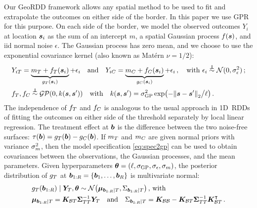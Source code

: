 \documentclass{article}
\begin{document}
\label{sec:gpmodel}
Our GeoRDD framework allows any spatial method to be used to fit and extrapolate the outcomes on either side of the border.
In this paper we use GPR \citep{banerjee2014hierarchical,rasmussen2006gaussian} for this purpose.
On each side of the border, we model the observed outcomes \(Y_i\) at location \(\bm{s}_i\) as the sum of an intercept \(m\), a spatial Gaussian process \(f(\bm{s})\), and iid normal noise \(\epsilon\).
The Gaussian process has zero mean, and we choose to use the exponential covariance kernel (also known as Mat\'ern \(\nu=1/2\)):
\begin{equation}
    \begin{split}
        & Y_{i\treat} = \underbrace{m_\treat{} + f_\treat{}(\svec_i)}_{g_\treat{}(\svec_i)} + \epsilon_i \quad\text{and}\quad
          Y_{i\ctrol} = \underbrace{m_\ctrol{} + f_\ctrol{}(\svec_i)}_{g_\ctrol{}(\svec_i)} + \epsilon_i 
          \,,\quad\text{with } \epsilon_i \overset{\indep}{\sim} \normal(0, \sigman^2) \,; \\
        & f_\treat{}, f_\ctrol{} \overset{\indep}{\sim} \GP\del{0, k(\svec, \svec')} \quad\text{with}\quad
        k(\svec,\svec') = \sigmaf^2 \exp\del{-\norm{\svec-\svec'}_2 \big/ \ell} \,.
    \end{split}
    \label{eq:spec2gp}
\end{equation}
The independence of \(f_T{}\) and \(f_C{}\) is analogous to the usual approach in 1D~RDDs of fitting the outcomes on either side of the threshold separately by local linear regression.
The treatment effect at \(\bm{b}\) is the difference between the two noise-free surfaces:
    \(\tau(\bm{b}) = g_T{}(\bm{b}) - g_C{}(\bm{b})\).
\label{sec:inference}
If \(m_T\) and \(m_C\) are given normal priors with variance \(\sigma_{m}^2\), then the model specification \autoref{eq:spec2gp} can be used to obtain covariances between the observations, the Gaussian processes, and the mean parameters.
Given hyperparameters \(\bm{\theta} = \left\lparen\ell,\sigma_{\mathrm{GP}}, \sigma_{\epsilon}, \sigma_{m}\right\rparen\), the posterior distribution of \(g_T\) at \(\bm{b}_{1:R}=\left\lbrace\bm{b}_1,\ldots,\bm{b}_R\right\rbrace\) is multivariate normal:
\begin{equation}\begin{split}
    & g_\treat{}(\sentinels) \mid \yt{}, \hyperparam \sim \normal\del{\muvec_{\sentinels \mid T}, \Sigma_{\sentinels \mid T}} \,\text{, with} \\
    & \muvec_{\sentinels \mid T} =
    \KBT
    \STT^{-1} 
    \yt{} 
    \quad\text{and}\quad
    \Sigma_{\sentinels \mid T} =
    \KBB - \KBT \STT^{-1} \KBT\trans \,.
\end{split}
\label{eq:postvar2gp_t_or_c}
\end{equation}
\end{document}
